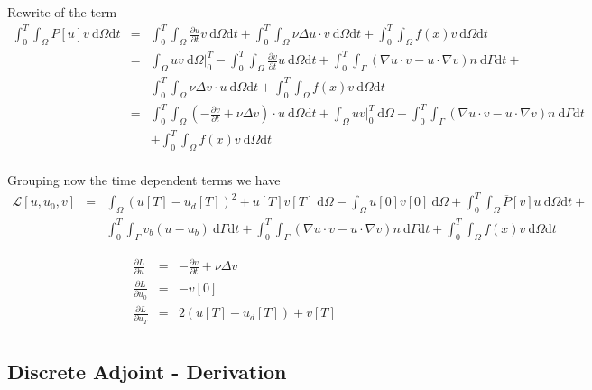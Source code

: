 \documentclass[10pt]{article}
\renewcommand{\d}{\mathrm{d}}
\begin{document}
Rewrite of the term
\begin{eqnarray}
\int_0^T\int_{\Omega} P[u]  v \ \d \Omega \d t &=&
\int_0^T\int_{\Omega} \frac{\partial u}{\partial t}  v \ \d \Omega \d t+ \int_0^T\int_{\Omega} \nu\Delta  u \cdot  v \ \d \Omega \d t+\int_0^T\int_{\Omega}  f( x)   v \ \d \Omega \d t \\ \nonumber
&=& \int_{\Omega} u v \ \d \Omega|_0^T -
\int_0^T\int_{\Omega}
 \frac{\partial v}{\partial t}  u \ \d \Omega \d t+ \int_0^T\int_{\Gamma}(\nabla  u\cdot  v-  u\cdot \nabla v) n\ \d \Gamma \d t + \\ \nonumber
 && \int_0^T\int_{\Omega} \nu\Delta  v\cdot   u \ \d \Omega \d t+
 \int_0^T\int_{\Omega}  f( x)   v \ \d \Omega \d t \\ \nonumber
 &=& 
\int_0^T\int_{\Omega}
(- \frac{\partial v}{\partial t}  +\nu\Delta  v)\cdot   u\ \d \Omega \d t+\int_{\Omega} u v |_0^T \ \d \Omega
+ \int_0^T\int_{\Gamma}(\nabla  u\cdot  v-  u\cdot \nabla v) n\ \d \Gamma \d t \\ \nonumber
&&+
 \int_0^T\int_{\Omega}  f( x)   v \ \d \Omega \d t \\ \nonumber
\end{eqnarray}

Grouping now the time dependent terms we have
\begin{eqnarray}
\mathcal{L}[ u, u_0,  v]&=&\int_{\Omega}( u[T]- u_d[T])^2 + u[T] v[T]\ \d \Omega -\int_{\Omega} u[0] v[0]\ \d \Omega+\int_0^T\int_{\Omega} \overline{P}[ v]  u \ \d \Omega \d t + \\ \nonumber
 && \int_0^T\int_{\Gamma}  v_b  ( u-  u_b) \ \d \Gamma \d t +\int_0^T\int_{\Gamma}(\nabla  u\cdot  v-  u\cdot \nabla v) n\ \d \Gamma \d t +
 \int_0^T\int_{\Omega}  f( x)   v \ \d \Omega \d t 
\end{eqnarray}

\begin{eqnarray}
\frac{\partial L}{\partial  u}&=&- \frac{\partial v}{\partial t}  +\nu\Delta  v \\
\frac{\partial L}{\partial  u_0}&=&- v[0]\\ \nonumber
\frac{\partial L}{\partial  u_T}&=&2( u[T]- u_d[T])+ v[T]\\ \nonumber
\end{eqnarray}

\subsection{Discrete Adjoint - Derivation\label{sec:adj:discrete}} 
\end{document}

